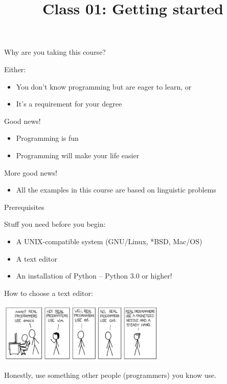 \documentclass[10pt, compress]{beamer}
\title{Class 01: Getting started }
\begin{document}
\maketitle

\begin{frame}{Why are you taking this course?}

Either:
\begin{itemize}
  \item You don't know programming but are eager to learn, or
  \item It's a requirement for your degree
\end{itemize}

Good news!
\begin{itemize}
  \item Programming is fun
  \item Programming will make your life easier
\end{itemize}

More good news! 
\begin{itemize}
  \item All the examples in this course are based on linguistic problems
\end{itemize}

\end{frame}

\begin{frame}{Prerequisites}

Stuff you need before you begin:
\begin{itemize}
 \item A UNIX-compatible system (GNU/Linux, *BSD, Mac/OS)
 \item A text editor
 \item An installation of Python -- Python 3.0 or higher!
\end{itemize}

How to choose a text editor:

\begin{center}
  \includegraphics[width=0.6\textwidth]{graphics/realprogrammers.png}
\end{center}

Honestly, use something other people (programmers) you know use.

\end{frame}
\end{document}
